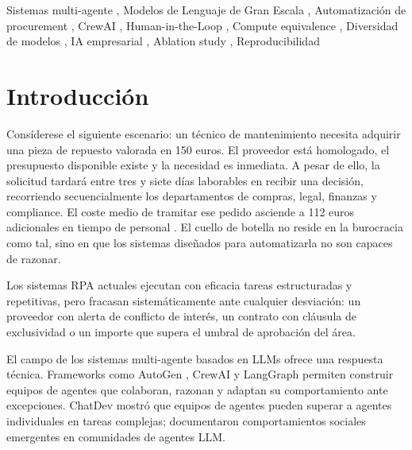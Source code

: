 \documentclass[preprint,12pt,authoryear]{elsarticle}
\begin{document}
\begin{frontmatter}
\begin{keyword}
Sistemas multi-agente \sep
Modelos de Lenguaje de Gran Escala \sep
Automatizaci\'on de procurement \sep
CrewAI \sep
Human-in-the-Loop \sep
Compute equivalence \sep
Diversidad de modelos \sep
IA empresarial \sep
Ablation study \sep
Reproducibilidad
\end{keyword}

\end{frontmatter}

\section{Introducci\'on}
\label{sec:introduccion}

Cons\'iderese el siguiente escenario: un t\'ecnico de mantenimiento necesita
adquirir una pieza de repuesto valorada en 150 euros.
El proveedor est\'a homologado, el presupuesto disponible existe y la necesidad
es inmediata.
A pesar de ello, la solicitud tardar\'a entre tres y siete d\'ias laborables en
recibir una decisi\'on, recorriendo secuencialmente los departamentos de compras,
legal, finanzas y compliance.
El coste medio de tramitar ese pedido asciende a 112 euros adicionales en tiempo
de personal \citep{hackett2023}.
El cuello de botella no reside en la burocracia como tal, sino en que los
sistemas dise\~nados para automatizarla no son capaces de razonar.

Los sistemas RPA actuales ejecutan con eficacia tareas estructuradas y
repetitivas, pero fracasan sistem\'aticamente ante cualquier desviaci\'on: un
proveedor con alerta de conflicto de inter\'es, un contrato con cl\'ausula de
exclusividad o un importe que supera el umbral de aprobaci\'on del \'area.

El campo de los sistemas multi-agente basados en LLMs ofrece una respuesta
t\'ecnica. Frameworks como AutoGen \citep{wu2023autogen}, CrewAI
\citep{crewai2024} y LangGraph permiten construir equipos de agentes que
colaboran, razonan y adaptan su comportamiento ante excepciones.
ChatDev \citep{qian2023chatdev} mostr\'o que equipos de agentes pueden superar
a agentes individuales en tareas complejas; \citet{park2023generative}
documentaron comportamientos sociales emergentes en comunidades de agentes LLM.
\end{document}
